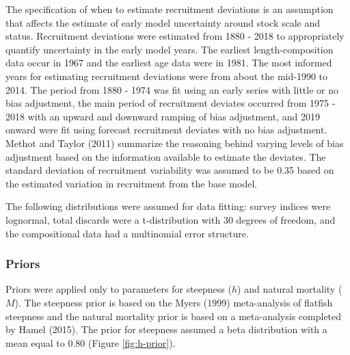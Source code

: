\documentclass[11pt,
  english,
  a4paper,
]{article}
\begin{document}
The specification of when to estimate recruitment deviations is an assumption that affects the estimate of early model uncertainty around stock scale and status. Recruitment deviations were estimated from 1880 - 2018 to appropriately quantify uncertainty in the early model years. The earliest length-composition data occur in 1967 and the earliest age data were in 1981. The most informed years for estimating recruitment deviations were from about the mid-1990 to 2014. The period from 1880 - 1974 was fit using an early series with little or no bias adjustment, the main period of recruitment deviates occurred from 1975 - 2018 with an upward and downward ramping of bias adjustment, and 2019 onward were fit using forecast recruitment deviates with no bias adjustment. Methot and Taylor {(2011)\leavevmode\tagmcend\tagstructend} summarize the reasoning behind varying levels of bias adjustment based on the information available to estimate the deviates. The standard deviation of recruitment variability was assumed to be 0.35 based on the estimated variation in recruitment from the base model.

\leavevmode\tagmcend\tagstructend\par


The following distributions were assumed for data fitting: survey indices were lognormal, total discards were a t-distribution with 30 degrees of freedom, and the compositional data had a multinomial error structure.

\leavevmode\tagmcend\tagstructend\par


\hypertarget{priors}{%
\subsubsection{Priors}\label{priors}}

\leavevmode\tagmcend\tagstructend


Priors were applied only to parameters for steepness ({\(h\)\leavevmode\tagmcend\tagstructend}) and natural mortality ({\(M\)\leavevmode\tagmcend\tagstructend}). The steepness prior is based on the Myers {(1999)\leavevmode\tagmcend\tagstructend} meta-analysis of flatfish steepness and the natural mortality prior is based on a meta-analysis completed by Hamel {(2015)\leavevmode\tagmcend\tagstructend}. The prior for steepness assumed a beta distribution with a mean equal to 0.80 (Figure \ref{fig:h-prior}).
\end{document}
